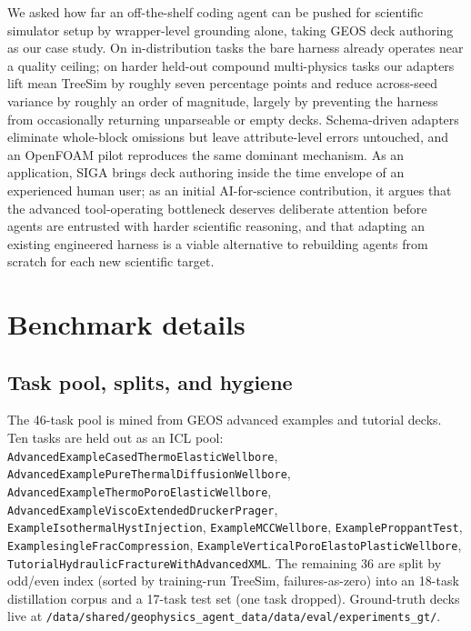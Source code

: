 \documentclass{article}
\begin{document}
We asked how far an off-the-shelf coding agent can be pushed for scientific simulator setup by wrapper-level grounding alone, taking GEOS deck authoring as our case study. On in-distribution tasks the bare harness already operates near a quality ceiling; on harder held-out compound multi-physics tasks our adapters lift mean TreeSim by roughly seven percentage points and reduce across-seed variance by roughly an order of magnitude, largely by preventing the harness from occasionally returning unparseable or empty decks. Schema-driven adapters eliminate whole-block omissions but leave attribute-level errors untouched, and an OpenFOAM pilot reproduces the same dominant mechanism. As an application, SIGA brings deck authoring inside the time envelope of an experienced human user; as an initial AI-for-science contribution, it argues that the advanced tool-operating bottleneck deserves deliberate attention before agents are entrusted with harder scientific reasoning, and that adapting an existing engineered harness is a viable alternative to rebuilding agents from scratch for each new scientific target.

\medskip

{
\small
}





\appendix

\section{Benchmark details}
\label{app:bench}

\subsection{Task pool, splits, and hygiene}
The 46-task pool is mined from GEOS advanced examples and tutorial decks. Ten tasks are held out as an ICL pool: \texttt{AdvancedExampleCasedThermoElasticWellbore}, \texttt{AdvancedExamplePureThermalDiffusionWellbore}, \texttt{AdvancedExampleThermoPoroElasticWellbore}, \texttt{AdvancedExampleViscoExtendedDruckerPrager}, \texttt{ExampleIsothermalHystInjection}, \texttt{ExampleMCCWellbore}, \texttt{ExampleProppantTest}, \texttt{ExamplesingleFracCompression}, \texttt{ExampleVerticalPoroElastoPlasticWellbore}, \texttt{TutorialHydraulicFractureWithAdvancedXML}. The remaining 36 are split by odd/even index (sorted by training-run TreeSim, failures-as-zero) into an 18-task distillation corpus and a 17-task test set (one task dropped). Ground-truth decks live at \texttt{/data/shared/geophysics\_agent\_data/data/eval/experiments\_gt/}.
\end{document}
